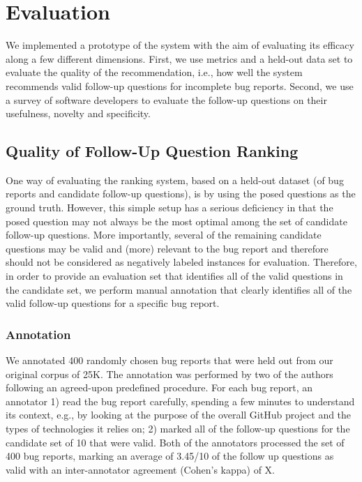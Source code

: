 \section{Evaluation}

We implemented a prototype of the system with the aim of evaluating its efficacy along
a few different dimensions. First, we use metrics and a held-out data set to evaluate the quality
of the recommendation, i.e., how well the system recommends valid follow-up questions for incomplete bug reports.
Second, we use a survey of software developers to evaluate the follow-up questions on their usefulness, novelty and specificity.


\subsection{Quality of Follow-Up Question Ranking}

One way of evaluating the ranking system, based on a held-out dataset (of bug reports and candidate follow-up questions), is
by using the posed questions as the ground truth. However, this simple setup has a serious deficiency in that the posed question
may not always be the most optimal among the set of candidate follow-up questions. More importantly, several of
the remaining candidate questions may be valid and (more) relevant to the bug report and therefore should
not be considered as negatively labeled instances for evaluation. Therefore, in order to provide an evaluation
set that identifies all of the valid questions in the candidate set, we perform manual annotation that clearly
identifies all of the valid follow-up questions for a specific bug report.

\subsubsection{Annotation}
We annotated 400 randomly chosen bug reports that were held out from our original corpus of 25K. The annotation
was performed by two of the authors following an agreed-upon predefined procedure. For each bug report, an annotator 1)
read the bug report carefully, spending a few minutes to understand its context, e.g., by looking at the purpose of the overall GitHub
project and the types of technologies it relies on; 2) marked all of the follow-up questions for the candidate set of 10
that were valid. Both of the annotators processed the set of 400 bug reports, marking an average of 3.45/10 of the follow up questions
as valid with an inter-annotator agreement (Cohen's kappa) of X.

